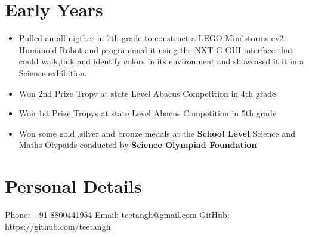 \documentclass[a4paper,12pt]{article}
\begin{document}
\section*{Early Years}
\begin{itemize}
    \item Pulled an all nigther in 7th grade to construct a LEGO Mindstorms ev2 
    Humanoid Robot and programmed it using the NXT-G GUI interface that could walk,talk 
    and identify colors in its environment and showcased it it in a Science exhibition.
    \item Won 2nd Prize Tropy at state Level Abacus Competition in 4th grade     
    \item Won 1st Prize Tropys at state Level Abacus Competition in 5th grade
    \item Won some gold ,silver and bronze medals at the \textbf{School Level}  Science 
    and Maths Olypaids conducted by \textbf{Science Olympiad Foundation}            
    
\end{itemize}

\section*{Personal Details}
Phone: +91-8800441954
\newline
Email: teetangh@gmail.com
\newline
GitHub: https://github.com/teetangh

\end{document}
